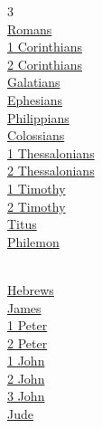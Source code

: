 \begin{multicols}{3}
\\
\hspace{1em}\hyperlink{book-romans}{Romans}\\
\hspace{1em}\hyperlink{book-1corinthians}{1 Corinthians}\\
\hspace{1em}\hyperlink{book-2corinthians}{2 Corinthians}\\
\hspace{1em}\hyperlink{book-galatians}{Galatians}\\
\hspace{1em}\hyperlink{book-ephesians}{Ephesians}\\
\hspace{1em}\hyperlink{book-philippians}{Philippians}\\
\hspace{1em}\hyperlink{book-colossians}{Colossians}\\
\hspace{1em}\hyperlink{book-1thessalonians}{1 Thessalonians}\\
\hspace{1em}\hyperlink{book-2thessalonians}{2 Thessalonians}\\
\hspace{1em}\hyperlink{book-1timothy}{1 Timothy}\\
\hspace{1em}\hyperlink{book-2timothy}{2 Timothy}\\
\hspace{1em}\hyperlink{book-titus}{Titus}\\
\hspace{1em}\hyperlink{book-philemon}{Philemon}\\
\vspace{4pt}

\\
\hspace{1em}\hyperlink{book-hebrews}{Hebrews}\\
\hspace{1em}\hyperlink{book-james}{James}\\
\hspace{1em}\hyperlink{book-1peter}{1 Peter}\\
\hspace{1em}\hyperlink{book-2peter}{2 Peter}\\
\hspace{1em}\hyperlink{book-1john}{1 John}\\
\hspace{1em}\hyperlink{book-2john}{2 John}\\
\hspace{1em}\hyperlink{book-3john}{3 John}\\
\hspace{1em}\hyperlink{book-jude}{Jude}\\
\vspace{4pt}


\end{multicols}
